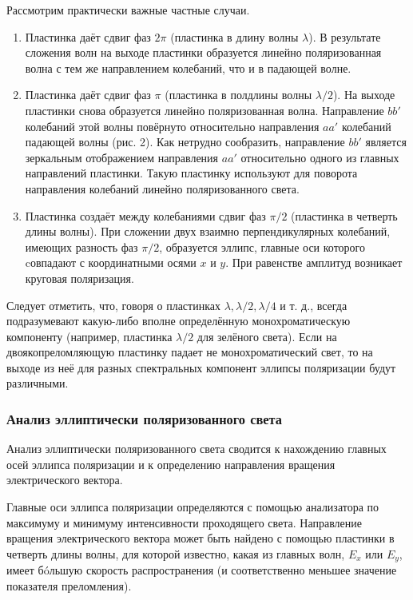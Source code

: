 Рассмотрим практически важные частные случаи.

\begin{enumerate}
 		
\item Пластинка даёт сдвиг фаз $ 2\pi $ (пластинка в длину волны $ \lambda $). В результате сложения волн на выходе пластинки образуется линейно поляризованная волна с тем же направлением колебаний, что и в падающей волне.

\item Пластинка даёт сдвиг фаз $ \pi $ (пластинка в полдлины волны $ \lambda / 2 $). На выходе пластинки снова образуется линейно поляризованная волна. Направление $ bb' $ колебаний этой волны повёрнуто относительно направления $ aa' $ колебаний падающей волны (рис. 2). Как нетрудно сообразить, направление $ bb' $ является зеркальным отображением направления $ aa' $ относительно одного из главных направлений пластинки. Такую пластинку используют для поворота направления колебаний линейно поляризованного света.
	
\item Пластинка создаёт между колебаниями сдвиг фаз $ \pi/2 $ (пластинка в четверть длины волны). При сложении двух взаимно перпендикулярных колебаний, имеющих разность фаз $ \pi/2 $, образуется эллипс, главные оси которого cовпадают с координатными осями $ x $ и $ y $. При равенстве амплитуд возникает круговая поляризация.
 	
\end{enumerate}

Следует отметить, что, говоря о пластинках $ \lambda , \lambda/2, \lambda/4  $ и т. д., всегда подразумевают какую-либо вполне определённую монохроматическую
компоненту (например, пластинка $ \lambda/2 $ для зелёного света). Если на двоякопреломляющую пластинку падает не монохроматический свет, то на
выходе из неё для разных спектральных компонент эллипсы поляризации будут различными.

\subsubsection{Анализ эллиптически поляризованного света}

Анализ эллиптически поляризованного света сводится к нахождению главных осей
эллипса поляризации и к определению направления вращения электрического вектора.

Главные оси эллипса поляризации определяются с помощью анализатора по максимуму и минимуму интенсивности проходящего света. Направление вращения электрического вектора может быть найдено с помощью пластинки в четверть длины волны, для которой известно, какая из главных волн, $ E_x $ или $ E_y $, имеет б\'{o}льшую скорость распространения (и соответственно меньшее значение показателя преломления).

